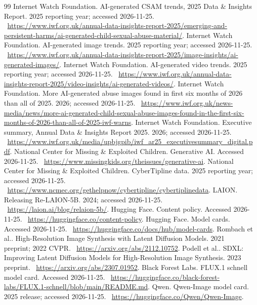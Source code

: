 \documentclass[10pt,a4paper]{article}
\begin{document}
\clearpage\begin{thebibliography}{99}\footnotesize\setlength{\itemsep}{0pt}\setlength{\parskip}{0pt}
 Internet Watch Foundation. AI-generated CSAM trends, 2025 Data \& Insights Report. 2025 reporting year; accessed 2026-11-25. \ \url{https://www.iwf.org.uk/annual-data-insights-report-2025/emerging-and-persistent-harms/ai-generated-child-sexual-abuse-material/}.
 Internet Watch Foundation. AI-generated image trends. 2025 reporting year; accessed 2026-11-25. \ \url{https://www.iwf.org.uk/annual-data-insights-report-2025/image-insights/ai-generated-images/}.
 Internet Watch Foundation. AI-generated video trends. 2025 reporting year; accessed 2026-11-25. \ \url{https://www.iwf.org.uk/annual-data-insights-report-2025/video-insights/ai-generated-videos/}.
 Internet Watch Foundation. More AI-generated abuse images found in first six months of 2026 than all of 2025. 2026; accessed 2026-11-25. \ \url{https://www.iwf.org.uk/news-media/news/more-ai-generated-child-sexual-abuse-images-found-in-the-first-six-months-of-2026-than-all-of-2025-iwf-warns}.
 Internet Watch Foundation. Executive summary, Annual Data \& Insights Report 2025. 2026; accessed 2026-11-25. \ \url{https://www.iwf.org.uk/media/upbjgpib/iwf_ar25_executivesummary_digital.pdf}.
 National Center for Missing \& Exploited Children. Generative AI. Accessed 2026-11-25. \ \url{https://www.missingkids.org/theissues/generative-ai}.
 National Center for Missing \& Exploited Children. CyberTipline data. 2025 reporting year; accessed 2026-11-25. \ \url{https://www.ncmec.org/gethelpnow/cybertipline/cybertiplinedata}.
 LAION. Releasing Re-LAION-5B. 2024; accessed 2026-11-25. \ \url{https://laion.ai/blog/relaion-5b/}.
 Hugging Face. Content policy. Accessed 2026-11-25. \ \url{https://huggingface.co/content-policy}.
 Hugging Face. Model cards. Accessed 2026-11-25. \ \url{https://huggingface.co/docs/hub/model-cards}.
 Rombach et al.. High-Resolution Image Synthesis with Latent Diffusion Models. 2021 preprint; 2022 CVPR. \ \url{https://arxiv.org/abs/2112.10752}.
 Podell et al.. SDXL: Improving Latent Diffusion Models for High-Resolution Image Synthesis. 2023 preprint. \ \url{https://arxiv.org/abs/2307.01952}.
 Black Forest Labs. FLUX.1 schnell model card. Accessed 2026-11-25. \ \url{https://huggingface.co/black-forest-labs/FLUX.1-schnell/blob/main/README.md}.
 Qwen. Qwen-Image model card. 2025 release; accessed 2026-11-25. \ \url{https://huggingface.co/Qwen/Qwen-Image}.

\end{thebibliography}
\end{document}
